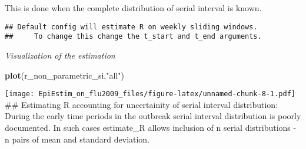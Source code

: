 \documentclass[
]{article}
\newenvironment{Shaded}{\begin{snugshade}}{\end{snugshade}}
\newcommand{\AttributeTok}[1]{\textcolor[rgb]{0.13,0.29,0.53}{#1}}
\newcommand{\DecValTok}[1]{\textcolor[rgb]{0.00,0.00,0.81}{#1}}
\newcommand{\FloatTok}[1]{\textcolor[rgb]{0.00,0.00,0.81}{#1}}
\newcommand{\FunctionTok}[1]{\textcolor[rgb]{0.13,0.29,0.53}{\textbf{#1}}}
\newcommand{\NormalTok}[1]{#1}
\newcommand{\OtherTok}[1]{\textcolor[rgb]{0.56,0.35,0.01}{#1}}
\newcommand{\SpecialCharTok}[1]{\textcolor[rgb]{0.81,0.36,0.00}{\textbf{#1}}}
\newcommand{\StringTok}[1]{\textcolor[rgb]{0.31,0.60,0.02}{#1}}
\begin{document}
This is done when the complete distribution of serial interval is known.

\begin{Shaded}
\end{Shaded}

\begin{verbatim}
## Default config will estimate R on weekly sliding windows.
##     To change this change the t_start and t_end arguments.
\end{verbatim}

\emph{Visualization of the estimation}

\begin{Shaded}
\begin{Highlighting}[]
\FunctionTok{plot}\NormalTok{(r\_non\_parametric\_si,}\StringTok{"all"}\NormalTok{)}
\end{Highlighting}
\end{Shaded}

\texttt{[image: EpiEstim\_on\_flu2009\_files/figure-latex/unnamed-chunk-8-1.pdf]}
\#\# Estimating R accounting for uncertainity of serial interval
distribution: During the early time periods in the outbreak serial
interval distribution is poorly documented. In such cases estimate\_R
allows inclusion of n serial distributions - n pairs of mean and
standard deviation.

\begin{Shaded}
\end{Shaded}
\end{document}

